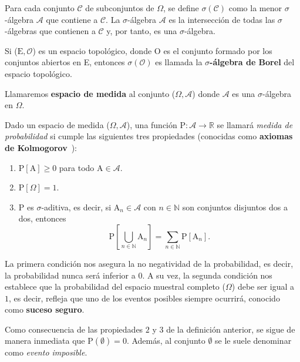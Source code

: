 \begin{definicion}\label{def:sigma-algebra-borel}
    Para cada conjunto $\mathcal{C}$ de subconjuntos de $\Omega$, se define $\sigma(\mathcal{C})$ como la menor $\sigma$-álgebra $\mathcal{A}$ que contiene a $\mathcal{C}$. La $\sigma$-álgebra $\mathcal{A}$ es la intersección de todas las $\sigma$-álgebras que contienen a $\mathcal{C}$ y, por tanto, es una $\sigma$-álgebra.

    Si ($\mathrm{E}, \mathcal{O}$) es un espacio topológico, donde $\mathrm{O}$ es el conjunto formado por los conjuntos abiertos en E, entonces $\sigma(\mathcal{O})$ es llamada la \textbf{$\sigma$-álgebra de Borel} del espacio topológico.
\end{definicion}

Llamaremos \textbf{espacio de medida} al conjunto ($\Omega, \mathcal{A}$) donde $\mathcal{A}$ es una $\sigma$-álgebra en $\Omega$.

\begin{definicion}\label{def:medida-de-probabilidad}
    Dado un espacio de medida ($\Omega, \mathcal{A}$), una función $\mathrm{P}: \mathcal{A} \to \mathbb{R}$ se llamará \emph{medida de probabilidad} si cumple las siguientes tres propiedades (conocidas como \textbf{axiomas de Kolmogorov}~\cite{Kolmogorov1956}):

    \begin{enumerate}
        \item $\mathrm{P}[\mathrm{A}] \ge 0$ para todo $\mathrm{A} \in \mathcal{A}$.
        \item $\mathrm{P}[\Omega]=1$.
        \item $\mathrm{P}$ es $\sigma$-aditiva, es decir, si $\mathrm{A}_n \in \mathcal{A}$ con $n \in \mathbb{N}$ son conjuntos disjuntos dos a dos, entonces 
        \[ \mathrm{P}\left[\bigcup_{n \in \mathbb{N}} \mathrm{A}_{n}\right] = \sum\limits_{n \in \mathbb{N}} \mathrm{P}[\mathrm{A}_n]. \]
    \end{enumerate}
\end{definicion}

La primera condición nos asegura la no negatividad de la probabilidad, es decir, la probabilidad nunca será inferior a $0$. A su vez, la segunda condición nos establece que la probabilidad del espacio muestral completo ($\Omega$) debe ser igual a $1$, es decir, refleja que uno de los eventos posibles siempre ocurrirá, conocido como \textbf{suceso seguro}.

\begin{observacion}
Como consecuencia de las propiedades $2$ y $3$ de la definición anterior, se sigue de manera inmediata que $\mathrm{P}(\emptyset) = 0$. Además, al conjunto $\emptyset$ se le suele denominar como \emph{evento imposible}.
\end{observacion}

